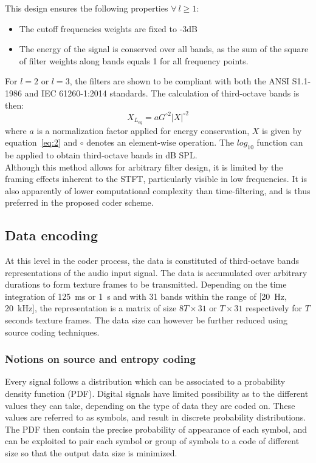 \documentclass[12pt,times,onecolumn]{article}
\begin{document}
\noindent This design ensures the following properties $\forall~l\geq 1$:
\begin{itemize}
\item The cutoff frequencies weights are fixed to -3dB
\item The energy of the signal is conserved over all bands, as the sum of the square of filter weights along bands equals 1 for all frequency points.
\end{itemize}
For $l = 2$ or $l = 3$, the filters are shown to be compliant with both the ANSI S1.1-1986 and IEC 61260-1:2014 standards. The calculation of third-octave bands is then:
\begin{equation}
X_{L_{eq}} = aG^{\circ2}|X|^{\circ2}
\end{equation}
where $a$ is a normalization factor applied for energy conservation, $X$ is given by equation~\ref{eq:2} and $\circ$ denotes an element-wise operation. The $log_{10}$ function can be applied to obtain third-octave bands in dB SPL.\\

Although this method allows for arbitrary filter design, it is limited by the framing effects inherent to the STFT, particularly visible in low frequencies. It is also apparently of lower computational complexity than time-filtering, and is thus preferred in the proposed coder scheme.

\subsection{Data encoding}
At this level in the coder process, the data is constituted of third-octave bands representations of the audio input signal. The data is accumulated over arbitrary durations to form texture frames to be transmitted. Depending on the time integration of 125~ms or 1~s and with 31 bands within the range of [20~Hz, 20~kHz], the representation is a matrix of size $8T\times 31$ or $T\times 31$ respectively for $T$ seconds texture frames. The data size can however be further reduced using source coding techniques.

\subsubsection{Notions on source and entropy coding}
Every signal follows a distribution which can be associated to a probability density function (PDF). Digital signals have limited possibility as to the different values they can take, depending on the type of data they are coded on. These values are referred to as symbols, and result in discrete probability distributions. The PDF then contain the precise probability of appearance of each symbol, and can be exploited to pair each symbol or group of symbols to a code of different size so that the output data size is minimized.\\
\end{document}
